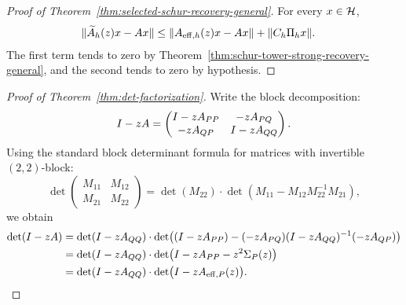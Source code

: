 \begin{proof}[Proof of Theorem~\ref{thm:selected-schur-recovery-general}]
\label{proof:thm:selected-schur-recovery-general}
For every $x\in\mathcal{H}$,
\begin{align*}
\|\widetilde A_h(z)x-Ax\|
&\le
\|A_{\mathrm{eff},h}(z)x-Ax\|
+
\|C_h\Pi_{h}x\|.
\end{align*}
The first term tends to zero by
Theorem~\ref{thm:schur-tower-strong-recovery-general}, and the second tends to
zero by hypothesis.
\end{proof}

\begin{proof}[Proof of Theorem~\ref{thm:det-factorization}]
\label{proof:thm:det-factorization}
Write the block decomposition:
\[
I - zA = \begin{pmatrix} I - zA_{PP} & -zA_{PQ} \\ -zA_{QP} & I - zA_{QQ} \end{pmatrix}.
\]
Using the standard block determinant formula for matrices with invertible $(2,2)$-block:
\[
\det\begin{pmatrix} M_{11} & M_{12} \\ M_{21} & M_{22} \end{pmatrix} = \det(M_{22}) \cdot \det(M_{11} - M_{12} M_{22}^{-1} M_{21}),
\]
we obtain
\begin{align*}
\det(I - zA) &= \det(I - zA_{QQ}) \cdot \det\bigl( (I - zA_{PP}) - (-zA_{PQ})(I - zA_{QQ})^{-1}(-zA_{QP}) \bigr) \\
&= \det(I - zA_{QQ}) \cdot \det\bigl( I - zA_{PP} - z^2 \Sigma_{P}(z) \bigr) \\
&= \det(I - zA_{QQ}) \cdot \det\bigl( I - zA_{\mathrm{eff},P}(z) \bigr).
\end{align*}
\end{proof}


